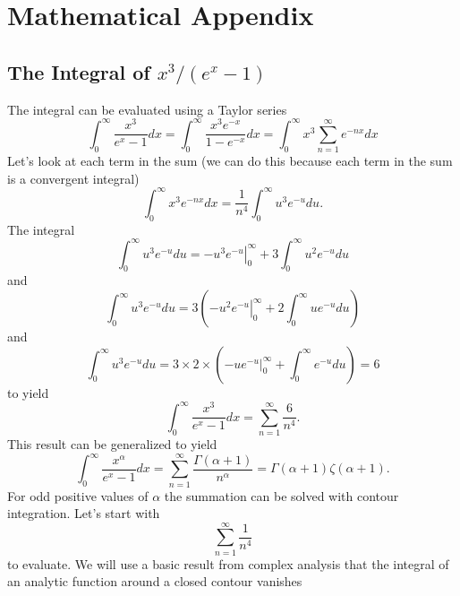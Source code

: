 \chapter{Mathematical Appendix}
\label{cha:math-append}

\section{The Integral of $x^3/(e^x-1)$}
\label{sec:integral-b_nut}

The integral can be evaluated using a Taylor series
\begin{equation}
\int_0^\infty \frac{x^3}{e^x - 1} d x
= \int_0^\infty \frac{x^3 e^{-x}}{1-e^{-x}} d x =
\int_0^\infty x^3 \sum_{n=1}^{\infty} e^{-nx} d x
\label{eq:796}
\end{equation} 
Let's look at each term in the sum (we can do this because each
term in the sum is a convergent integral)
\begin{equation}
\int_0^\infty x^3 e^{-nx} dx = \frac{1}{n^4} \int_0^\infty u^3 e^{-u}
du.
\label{eq:801}
\end{equation}
The integral 
\begin{equation}
\int_0^\infty u^3 e^{-u} du = \left . -u^3 e^{-u} \right |_0^\infty 
+ 3 \int_0^\infty u^2 e^{-u} du
\end{equation}
and
\begin{equation}
\int_0^\infty u^3 e^{-u} du = 3 \left ( \left . -u^2 e^{-u}
  \right|_0^\infty  + 2 \int_0^\infty u e^{-u} du  \right )
\end{equation}
and
\begin{equation}
\int_0^\infty u^3 e^{-u} du = 3 \times 2 \times \left ( \left . -u e^{-u}
  \right|_0^\infty  + \int_0^\infty e^{-u} du  \right ) = 6
\end{equation}
to yield
\begin{equation}
\int_0^\infty \frac{x^3}{e^x - 1} d x = \sum_{n=1}^\infty \frac{6}{n^4}.
\label{eq:800}
\end{equation}
This result can be generalized to yield
\begin{equation}
\int_0^\infty \frac{x^\alpha}{e^x - 1} d x = \sum_{n=1}^\infty
\frac{\Gamma(\alpha+1)}{n^\alpha} = \Gamma(\alpha+1) \zeta(\alpha+1).
\label{eq:828}
\end{equation}
For odd positive values of $\alpha$ the summation can be solved with contour
integration.  Let's start with
$$
\sum_{n=1}^\infty \frac{1}{n^4}
$$ 
to evaluate.  We will use a basic result from complex analysis that
the integral of an analytic function around a closed contour vanishes
